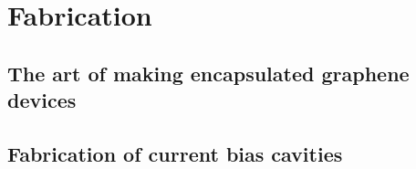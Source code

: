 \section{Fabrication}
\label{sec:fabrication}

\subsection{The art of making encapsulated graphene devices}


\subsection{Fabrication of current bias cavities}

